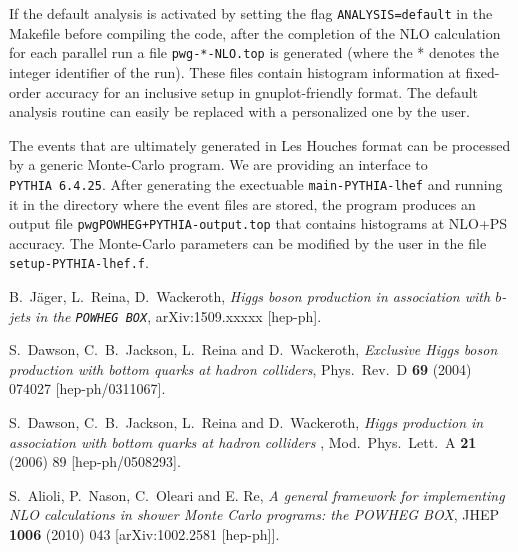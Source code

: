 \documentclass[a4paper,11pt]{article}
\newcommand\POWHEGBOX{{\tt POWHEG BOX}}
\newcommand\PYTHIA{{\tt PYTHIA}}
\begin{document}
If the default analysis is activated by setting the flag 
{\tt ANALYSIS=default} in the Makefile before compiling the code, after the completion of the NLO calculation for each parallel run a file {\tt  pwg-*-NLO.top} is generated (where the * denotes the integer
identifier of the run). These files contain histogram information at fixed-order accuracy for an inclusive setup in gnuplot-friendly format. The default analysis routine can easily be replaced with a personalized one by the user.  

The events that are ultimately generated in Les Houches format can be processed by a generic Monte-Carlo program. We are providing an interface to \PYTHIA~{\tt 6.4.25}. After generating the exectuable {\tt main-PYTHIA-lhef} and running it in the directory where the event files are stored, the program produces an output file {\tt pwgPOWHEG+PYTHIA-output.top} that contains histograms at NLO+PS accuracy. The Monte-Carlo parameters can be modified by the user in the file {\tt setup-PYTHIA-lhef.f}. 

%
\begin{thebibliography}{99}

 B.~J\"ager, L.~Reina, D.~Wackeroth, {\em Higgs boson production in association with $b$-jets in the  \POWHEGBOX{}}, arXiv:1509.xxxxx [hep-ph]. 

  S.~Dawson, C.~B.~Jackson, L.~Reina and D.~Wackeroth,
  {\em Exclusive Higgs boson production with bottom quarks at hadron colliders},
  Phys.\ Rev.\ D {\bf 69} (2004) 074027
  [hep-ph/0311067].

  S.~Dawson, C.~B.~Jackson, L.~Reina and D.~Wackeroth,
  {\em Higgs production in association with bottom quarks at hadron colliders} ,
  Mod.\ Phys.\ Lett.\ A {\bf 21} (2006) 89
  [hep-ph/0508293].

 S.~Alioli, P.~Nason, C.~Oleari and E. Re, {\em
    A general framework for implementing NLO calculations in shower
    Monte Carlo programs: the POWHEG BOX}, JHEP {\bf 1006} (2010)
  043  [arXiv:1002.2581 [hep-ph]].

\end{thebibliography}
\end{document}
